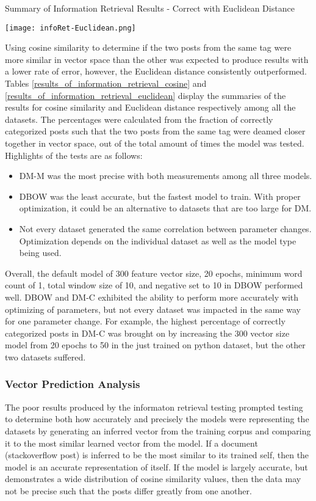 \begin{table}[ht]
\caption{Summary of Information Retrieval Results - Correct with Euclidean Distance}
\label{results_of_information_retrieval_euclidean}
\centering
\texttt{[image: infoRet-Euclidean.png]}
\end{table}

Using cosine similarity to determine if the two posts from the same tag were more similar in vector space than the other was expected to produce results with a lower rate of error, however, the Euclidean distance consistently outperformed. Tables \ref{results_of_information_retrieval_cosine} and \ref{results_of_information_retrieval_euclidean} display the summaries of the results for cosine similarity and Euclidean distance respectively among all the datasets. The percentages were calculated from the fraction of correctly categorized posts such that the two posts from the same tag were deamed closer together in vector space, out of the total amount of times the model was tested. Highlights of the tests are as follows:

\begin{itemize}
  \item DM-M was the most precise with both measurements among all three models. 
  \item DBOW was the least accurate, but the fastest model to train. With proper optimization, it could be an alternative to datasets that are too large for DM.
  \item Not every dataset generated the same correlation between parameter changes. Optimization depends on the individual dataset as well as the model type being used.
\end{itemize}

Overall, the default model of 300 feature vector size, 20 epochs, minimum word count of 1, total window size of 10, and negative set to 10 in DBOW performed well. DBOW and DM-C exhibited the ability to perform more accurately with optimizing of parameters, but not every dataset was impacted in the same way for one parameter change. For example, the highest percentage of correctly categorized posts in DM-C was brought on by increasing the 300 vector size model from 20 epochs to 50 in the just trained on python dataset, but the other two datasets suffered.

\subsubsection{Vector Prediction Analysis} The poor results produced by the informaton retrieval testing prompted testing to determine both how accurately and precisely the models were representing the datasets by generating an inferred vector from the training corpus and comparing it to the most similar learned vector from the model. If a document (stackoverflow post) is inferred to be the most similar to its trained self, then the model is an accurate representation of itself. If the model is largely accurate, but demonstrates a wide distribution of cosine similarity values, then the data may not be precise such that the posts differ greatly from one another. 

